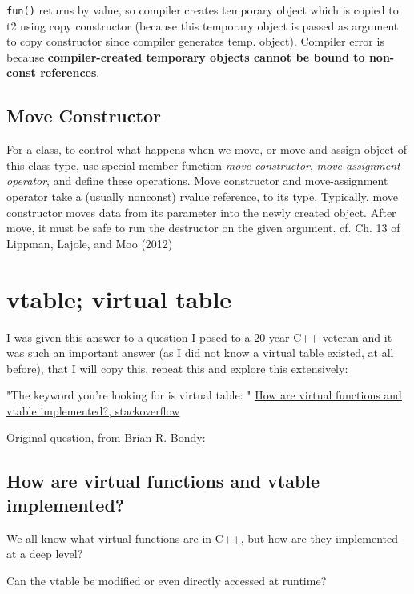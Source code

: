 \documentclass[10pt]{amsart}
\begin{document}
\verb|fun()| returns by value, so compiler creates temporary object which is copied to t2 using copy constructor (because this temporary object is passed as argument to copy constructor since compiler generates temp. object).  
Compiler error is because \textbf{compiler-created temporary objects cannot be bound to non-const references}. 



\subsection{Move Constructor}  

For a class, to control what happens when we move, or move and assign object of this class type, use special member function \emph{move constructor}, \emph{move-assignment operator}, and define these operations.  Move constructor and move-assignment operator take a (usually nonconst) rvalue reference, to its type.  Typically, move constructor moves data from its parameter into the newly created object.  After move, it must be safe to run the destructor on the given argument.  cf. Ch. 13 of Lippman, Lajole, and Moo (2012) \cite{LLM2012}



\section{vtable; virtual table}  

I was given this answer to a question I posed to a 20 year C++ veteran and it was such an important answer (as I did not know a virtual table existed, at all before), that I will copy this, repeat this and explore this extensively:  

"The keyword you're looking for is virtual table: " \href{https://stackoverflow.com/questions/99297/how-are-virtual-functions-and-vtable-implemented}{How are virtual functions and vtable implemented?, stackoverflow}  

Original question, from \href{https://stackoverflow.com/users/3153/brian-r-bondy}{Brian R. Bondy}:  

\subsection{How are virtual functions and vtable implemented?}

We all know what virtual functions are in C++, but how are they implemented at a deep level?

Can the vtable be modified or even directly accessed at runtime?
\end{document}
